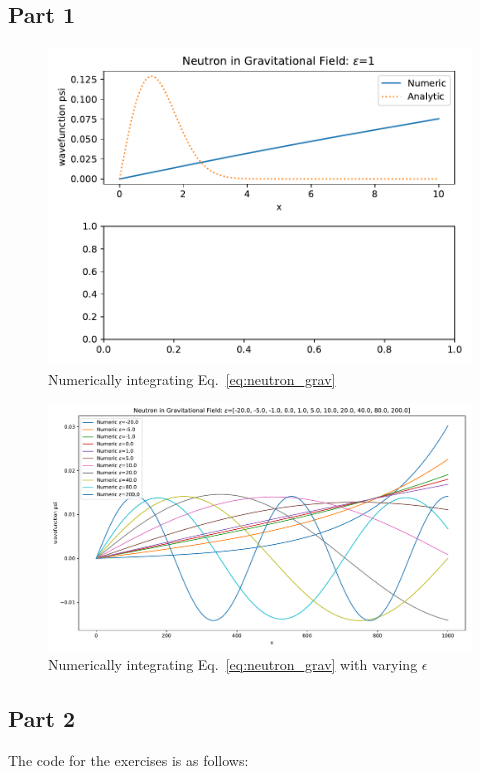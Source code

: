 \documentclass[12pt,a4paper,twoside]{article}
\begin{document}
\subsection*{Part 1}

\begin{figure}[h!]
  \centering
  \includegraphics[width=.9\textwidth]{../exercise4_problem2_numIntegration.pdf}
  \caption{Numerically integrating Eq.~\ref{eq:neutron_grav}}
  \label{fig:2a}
\end{figure}

\begin{figure}[h!]
  \centering
  \includegraphics[width=.9\textwidth]{../exercise4_problem2_varyEps.pdf}
  \caption{Numerically integrating Eq.~\ref{eq:neutron_grav} with varying $\epsilon$}
  \label{fig:2b}
\end{figure}


\subsection*{Part 2}




%
The code for the exercises is as follows:

\end{document}
